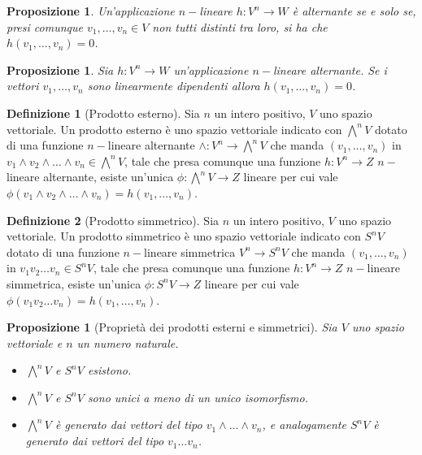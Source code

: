 \documentclass[11pt]{article}
\theoremstyle{plain}
\newtheorem{prop}[thm]{Proposizione}
\theoremstyle{definition}
\newtheorem{defn}{Definizione}[section]
\theoremstyle{remark}
\begin{document}
\begin{prop}
  Un'applicazione $n-$lineare $h: V^n \to W$ è alternante se e solo se, presi comunque $v_1,\dots,v_n\in V$
  non tutti distinti tra loro, si ha che $h(v_1,\dots,v_n)=0$.
\end{prop}

\begin{prop}
  Sia $h: V^n \to W$ un'applicazione $n-$lineare alternante. Se i vettori $v_1,\dots,v_n$ sono linearmente dipendenti allora
  $h(v_1,\dots,v_n)=0$.
\end{prop}


\begin{defn}[Prodotto esterno]
Sia $n$ un intero positivo, $V$ uno spazio vettoriale. Un prodotto esterno è uno spazio vettoriale indicato con $\bigwedge^n V$
dotato di una funzione $n-$lineare alternante $\wedge: V^n \to \bigwedge^n V$ che manda $(v_1,\ldots,v_n)$ in
$v_1\wedge v_2\wedge\ldots\wedge v_n \in \bigwedge^n V$, tale che presa comunque una funzione $h: V^n \to Z$ $n-$lineare alternante,
esiste un'unica $\phi: \bigwedge^n V \to Z $ lineare per cui vale $\phi(v_1\wedge v_2\wedge \ldots \wedge v_n)=h(v_1,\ldots,v_n)$.
\label{defn:prodotto esterno}
\end{defn}

\begin{defn}[Prodotto simmetrico]
Sia $n$ un intero positivo, $V$ uno spazio vettoriale. Un prodotto simmetrico è uno spazio vettoriale indicato con $S^n V$
dotato di una funzione $n-$lineare simmetrica $V^n \to S^n V$ che manda $(v_1,\ldots,v_n)$ in
$v_1 v_2\ldots v_n \in S^n V$, tale che presa comunque una funzione $h: V^n \to Z$ $n-$lineare simmetrica,
esiste un'unica $\phi: S^n V \to Z $ lineare per cui vale $\phi(v_1 v_2 \ldots v_n)=h(v_1,\ldots,v_n)$.
\label{defn:prodotto simmetrico}
\end{defn}


\begin{prop}[Proprietà dei prodotti esterni e simmetrici]
Sia $V$ uno spazio vettoriale e $n$ un numero naturale.
\begin{itemize}
\item $\bigwedge^nV$ e $S^nV$ esistono.
\item $\bigwedge^nV$ e $S^nV$ sono unici a meno di un unico isomorfismo.
\item $\bigwedge^nV$ è generato dai vettori del tipo $v_1\wedge \dots \wedge v_n$, e analogamente
      $S^nV$ è generato dai vettori del tipo $v_1\dots v_n$.
\end{itemize}
\end{prop}
\end{document}
